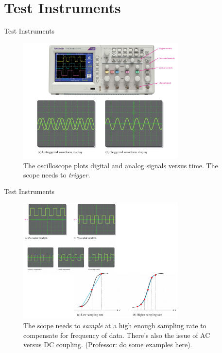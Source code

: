 \documentclass{beamer}
\begin{document}
\section{Test Instruments}

\begin{frame}{Test Instruments}
\small
\begin{figure}
\includegraphics[width=0.75\textwidth]{scope1.pdf}
\caption{\label{fig:scope1} The oscilloscope plots digital and analog signals versus time.  The scope needs to \textit{trigger.}}
\end{figure}
\end{frame}

\begin{frame}{Test Instruments}
\small
\begin{figure}
\includegraphics[width=0.75\textwidth]{scope2.pdf}
\caption{\label{fig:scope2} The scope needs to \textit{sample} at a high enough sampling rate to compensate for frequency of data.  There's also the issue of AC versus DC coupling.  (Professor: do some examples here).}
\end{figure}
\end{frame}
\end{document}
